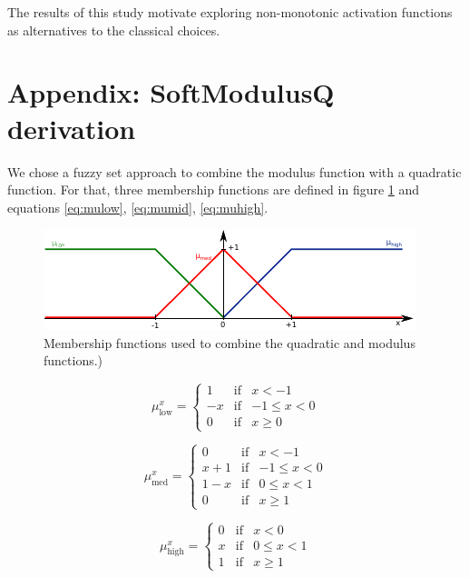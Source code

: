 \documentclass[authoryear]{elsarticle}
\begin{document}
The results of this study motivate exploring non-monotonic activation functions as alternatives to the classical choices.


\newpage

\newpage

\section*{Appendix: SoftModulusQ derivation}
We chose a fuzzy set approach to combine the modulus function with a quadratic function. For that, three membership functions are defined in figure \ref{fig:fuzzy} and equations \ref{eq:mulow}, \ref{eq:mumid}, \ref{eq:muhigh}. 
\begin{figure}[h!]
	\centering
	\includegraphics[width=0.7\linewidth]{figs/fuzzy}
	\caption{Membership functions used to combine the quadratic and modulus functions.)}
	\label{fig:fuzzy}
\end{figure}

\begin{equation}
	\label{eq:mulow}
	\mu^x_{\text{low}}= \left\{ \begin{array}{lcc}
		1 &   \text{if}  & x < -1 \\
		-x & \text{if}  & -1 \leq x < 0 \\
		0 &  \text{if} & x \geq 0 
		\end{array}
		\right.
\end{equation}

\begin{equation}
	\label{eq:mumid}
	\mu^x_{\text{med}}= \left\{ \begin{array}{lcc}
		0 &   \text{if}  & x < -1 \\
		x+1 & \text{if}  & -1 \leq x < 0 \\
		1-x & \text{if}  & 0 \leq x < 1 \\
		0 &  \text{if} & x \geq 1
		\end{array}
		\right.
\end{equation}

\begin{equation}
	\label{eq:muhigh}
	\mu^x_{\text{high}}= \left\{ \begin{array}{lcc}
	0 &   \text{if}  & x < 0 \\
	x & \text{if}  & 0 \leq x < 1 \\
	1 &  \text{if} & x \geq 1 
	\end{array}
	\right.
\end{equation}
\end{document}
